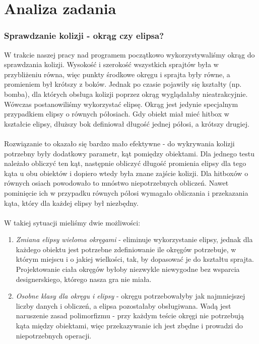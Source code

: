 \newpage
\part{\huge \textbf{Analiza zadania}}
	\section{Sprawdzanie kolizji - okrąg czy elipsa?}
		\indent \indent W trakcie naszej pracy nad programem początkowo wykorzystywaliśmy okrąg do sprawdzania kolizji. Wysokość i szerokość wszystkich sprajtów była w przybliżeniu równa, więc punkty środkowe okręgu i sprajta były równe, a promieniem był krótszy z boków. Jednak po czasie pojawiły się kształty (np. bomba), dla których obsługa kolizji poprzez okrąg wyglądałaby nieatrakcyjnie. Wówczas postanowiliśmy wykorzystać elipsę. Okrąg jest jedynie specjalnym przypadkiem elipsy o równych półosiach. Gdy obiekt miał mieć hitbox w kształcie elipsy, dłuższy bok definiował długość jednej półosi, a krótszy drugiej.\\\\
		\indent Rozwiązanie to okazało się bardzo mało efektywne - do wykrywania kolizji potrzebny były dodatkowy parametr, kąt pomiędzy obiektami. Dla jednego testu należało obliczyć ten kąt, następnie obliczyć długość promienia elipsy dla tego kąta u obu obiektów i dopiero wtedy była znane zajście kolizji. Dla hitboxów o równych osiach powodowało to mnóstwo niepotrzebnych obliczeń. Nawet pominięcie ich w przypadku równych półosi wymagało obliczania i przekazania kąta, który dla każdej elipsy był niezbędny.\\\\
		W takiej sytuacji mieliśmy dwie możliwości:
		\begin{enumerate}
			\item \textit{Zmiana elipsy wieloma okręgami} - eliminuje wykorzystanie elipsy, jednak dla każdego obiektu jest potrzebne zdefiniowanie ile okręgów potrzebuje, w którym miejscu i o jakiej wielkości, tak, by dopasować je do kształtu sprajta. Projektowanie ciała okręgów byłoby niezwykle niewygodne bez wsparcia designerskiego, którego nasza gra nie miała. 
			\item \textit{Osobne klasy dla okręgu i elipsy} - okręgu potrzebowałyby jak najmniejszej liczby danych i obliczeń, a elipsa pozostałaby obsługiwana. Wadą jest naruszenie zasad polimorfizmu - przy każdym teście okręgi nie potrzebują kąta między obiektami, więc przekazywanie ich jest zbędne i prowadzi do niepotrzebnych operacji.
		\end{enumerate}
